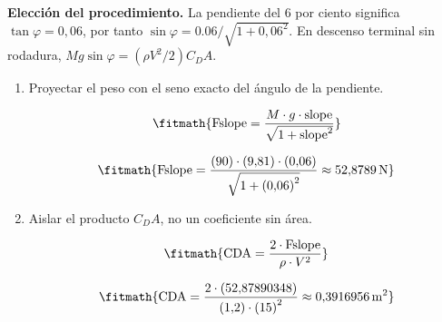 \noindent\textbf{Elección del procedimiento.} La pendiente del 6 por ciento significa $\tan\varphi=0{,}06$, por tanto $\sin\varphi=0.06/\sqrt{1+0{,}06^2}$. En descenso terminal sin rodadura, $Mg\sin\varphi=(\rho V^2/2)C_DA$.

\begin{enumerate}

\item Proyectar el peso con el seno exacto del ángulo de la pendiente.

\[\fitmath{\mathrm{Fslope}=\frac{M\cdot g\cdot \mathrm{slope}}{\sqrt{1+{\mathrm{slope}}^{2}}}}\]

\[\fitmath{\mathrm{Fslope}=\frac{(90)\cdot (9{,}81)\cdot (0{,}06)}{\sqrt{1+{(0{,}06)}^{2}}}\approx 52{,}8789\,\mathrm{N}}\]

\item Aislar el producto $C_DA$, no un coeficiente sin área.

\[\fitmath{\mathrm{CDA}=\frac{2\cdot \mathrm{Fslope}}{\rho\cdot {V}^{2}}}\]

\[\fitmath{\mathrm{CDA}=\frac{2\cdot (52{,}87890348)}{(1{,}2)\cdot {(15)}^{2}}\approx 0{,}3916956\,\mathrm{m^{2}}}\]

\end{enumerate}
